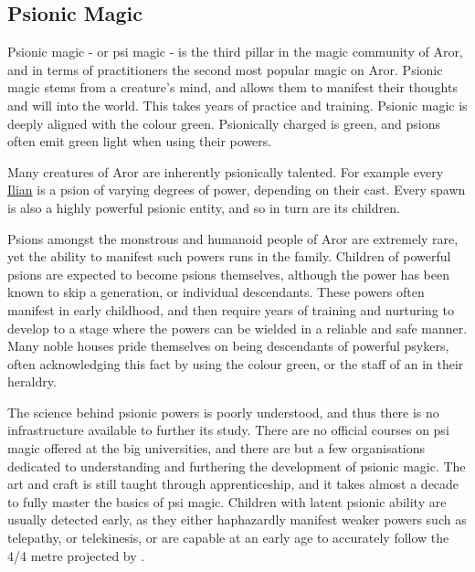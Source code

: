 \subsection{Psionic Magic}
\label{sec:Psionic Magic}

Psionic magic - or psi magic - is the third pillar in the magic community of
Aror, and in terms of practitioners the second most popular magic on
Aror. Psionic magic stems from a creature's mind, and allows them to manifest
their thoughts and will into the world. This takes years of practice and
training. Psionic magic is deeply aligned with the colour green. Psionically
charged  is green, and psions often emit green light
when using their powers.

Many creatures of Aror are inherently psionically talented. For example every
\hyperref[sec:Ilians]{Ilian} is a psion of varying degrees of power, depending
on their cast. Every  spawn is also a highly powerful
psionic entity, and so in turn are its children.

Psions amongst the monstrous and humanoid people of Aror are extremely rare,
yet the ability to manifest such powers runs in the family. Children of
powerful psions are expected to become psions themselves, although the power
has been known to skip a generation, or individual descendants. These powers
often manifest in early childhood, and then require years of training and
nurturing to develop to a stage where the powers can be wielded in a reliable
and safe manner. Many noble houses pride themselves on being descendants of
powerful psykers, often acknowledging this fact by using the colour green, or
the staff of an  in their heraldry.

The science behind psionic powers is poorly understood, and thus there is no
infrastructure available to further its study. There are no official courses
on psi magic offered at the big universities, and there are but a few
organisations dedicated to understanding and furthering the development of
psionic magic. The art and craft is still taught through apprenticeship, and
it takes almost a decade to fully master the basics of psi magic. Children
with latent psionic ability are usually detected early, as they either
haphazardly manifest weaker powers such as telepathy, or telekinesis, or
are capable at an early age to accurately follow the 4/4 metre projected by
.


